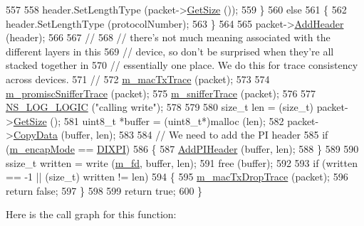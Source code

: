 \begin{DoxyCode}
557 
558       header.SetLengthType (packet->\hyperlink{classns3_1_1Packet_a462855c9929954d4301a4edfe55f4f1c}{GetSize} ());
559     \}
560   \textcolor{keywordflow}{else}
561     \{
562       header.SetLengthType (protocolNumber);
563     \}
564 
565   packet->\hyperlink{classns3_1_1Packet_a465108c595a0bc592095cbcab1832ed8}{AddHeader} (header);
566 
567   \textcolor{comment}{//}
568   \textcolor{comment}{// there's not much meaning associated with the different layers in this}
569   \textcolor{comment}{// device, so don't be surprised when they're all stacked together in}
570   \textcolor{comment}{// essentially one place.  We do this for trace consistency across devices.}
571   \textcolor{comment}{//}
572   \hyperlink{classns3_1_1FdNetDevice_a7a067bc7ab39f2ebfcc925a58da4f519}{m\_macTxTrace} (packet);
573 
574   \hyperlink{classns3_1_1FdNetDevice_a7f43138ecf824b335eb80eeebdb91eb6}{m\_promiscSnifferTrace} (packet);
575   \hyperlink{classns3_1_1FdNetDevice_a821080a2cc1253e22918e8fcedcfbe58}{m\_snifferTrace} (packet);
576 
577   \hyperlink{group__logging_ga88acd260151caf2db9c0fc84997f45ce}{NS\_LOG\_LOGIC} (\textcolor{stringliteral}{"calling write"});
578 
579 
580   \textcolor{keywordtype}{size\_t} len =  (size\_t) packet->\hyperlink{classns3_1_1Packet_a462855c9929954d4301a4edfe55f4f1c}{GetSize} ();
581   uint8\_t *buffer = (uint8\_t*)malloc (len);
582   packet->\hyperlink{classns3_1_1Packet_a5a6d304b9e0d90733919ffe224b98f0d}{CopyData} (buffer, len);
583 
584   \textcolor{comment}{// We need to add the PI header}
585   \textcolor{keywordflow}{if} (\hyperlink{classns3_1_1FdNetDevice_aa5d97abfd57576f6b80423ac764e5cc8}{m\_encapMode} == \hyperlink{classns3_1_1FdNetDevice_abdacbf10c181f50998a98e7688016618abbad9c0d0fe0604652f21e33cf4d8798}{DIXPI})
586     \{
587       \hyperlink{group__fd-net-device_gad3e41a1d562aec7c106c65c5964071b6}{AddPIHeader} (buffer, len);
588     \}
589 
590   ssize\_t written = write (\hyperlink{classns3_1_1FdNetDevice_a2351bba8f2719557d98ff85e88b451a5}{m\_fd}, buffer, len);
591   free (buffer);
592 
593   \textcolor{keywordflow}{if} (written == -1 || (\textcolor{keywordtype}{size\_t}) written != len)
594     \{
595       \hyperlink{classns3_1_1FdNetDevice_ad204b6948cb00479cc229465c6c07ebb}{m\_macTxDropTrace} (packet);
596       \textcolor{keywordflow}{return} \textcolor{keyword}{false};
597     \}
598 
599   \textcolor{keywordflow}{return} \textcolor{keyword}{true};
600 \}
\end{DoxyCode}


Here is the call graph for this function\+:




